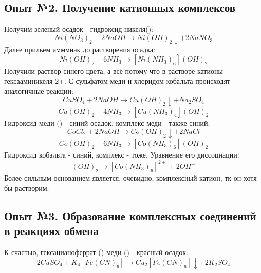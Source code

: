 \documentclass[a4paper,12pt]{article}
\newcommand{\RomanNumeralCaps}[1]
    {\MakeUppercase{\romannumeral #1}}
\begin{document}
\subsection{Опыт №2. Получение катионных комплексов}
Получим зеленый осадок - гидроксид никеля(\RomanNumeralCaps{2}):
\begin{equation}
    Ni(NO_3)_2 + 2NaOH \xrightarrow[]{} Ni(OH)_2 \downarrow+ 2NaNO_3
\end{equation}
Далее прильем амммиак до растворения осадка:
\begin{equation}
    Ni(OH)_2 + 6NH_3 \xrightarrow[]{} [Ni(NH_3)_6](OH)_2
\end{equation}
Получили раствор синего цвета, а всё потому что в растворе катионы гексааминикеля 2+.\newline
С сульфатом меди и хлоридом кобальта происходят аналогичные реакции:
\begin{equation}
    CuSO_4 + 2NaOH \xrightarrow[]{} Cu(OH)_2\downarrow + Na_2SO_4
\end{equation}
\begin{equation}
    Cu(OH)_2 + 4NH_3 \xrightarrow[]{} [Cu(NH_3)_4](OH)_2
\end{equation}
Гидроксид меди (\RomanNumeralCaps{2}) - синий осадок, комплекс меди - также синий.
\begin{equation}
    CoCl_2 + 2NaOH \xrightarrow[]{} Co(OH)_2\downarrow + 2NaCl
\end{equation}
\begin{equation}
    Co(OH)_2 + 6NH_3 \xrightarrow[]{} [Co(NH_3)_6](OH)_2
\end{equation}
Гидроксид кобальта - синий, комплекс - тоже. Уравнение его диссоциации:
\begin{equation}
    [Co(NH_3)_6](OH)_2 \xrightarrow[]{} [Co(NH_3)_6]^{2+} + 2OH^-
\end{equation}
Более сильным основанием является, очевидно, комплексный катион, тк он хотя бы растворим.
\subsection{Опыт №3. Образование комплексных соединений в реакциях обмена}
К счастью, гексацианоферрат (\RomanNumeralCaps{2}) меди (\RomanNumeralCaps{2}) - красный осадок:
\begin{equation}
    2CuSO_4 + K_4[Fe(CN)_6] \xrightarrow[]{} Cu_2[Fe(CN)_6]\downarrow +2K_2SO_4
\end{equation}
\end{document}
